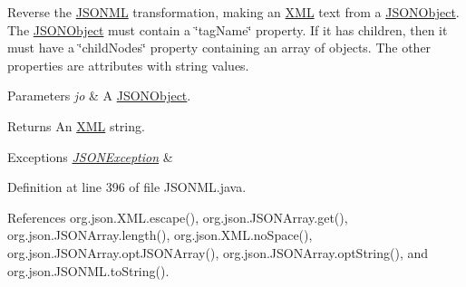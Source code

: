 Reverse the \hyperlink{classorg_1_1json_1_1_j_s_o_n_m_l}{J\-S\-O\-N\-M\-L} transformation, making an \hyperlink{classorg_1_1json_1_1_x_m_l}{X\-M\-L} text from a \hyperlink{classorg_1_1json_1_1_j_s_o_n_object}{J\-S\-O\-N\-Object}. The \hyperlink{classorg_1_1json_1_1_j_s_o_n_object}{J\-S\-O\-N\-Object} must contain a \char`\"{}tag\-Name\char`\"{} property. If it has children, then it must have a \char`\"{}child\-Nodes\char`\"{} property containing an array of objects. The other properties are attributes with string values. 
\begin{DoxyParams}{Parameters}
{\em jo} & A \hyperlink{classorg_1_1json_1_1_j_s_o_n_object}{J\-S\-O\-N\-Object}. \\
\hline
\end{DoxyParams}
\begin{DoxyReturn}{Returns}
An \hyperlink{classorg_1_1json_1_1_x_m_l}{X\-M\-L} string. 
\end{DoxyReturn}

\begin{DoxyExceptions}{Exceptions}
{\em \hyperlink{classorg_1_1json_1_1_j_s_o_n_exception}{J\-S\-O\-N\-Exception}} & \\
\hline
\end{DoxyExceptions}


Definition at line 396 of file J\-S\-O\-N\-M\-L.\-java.



References org.\-json.\-X\-M\-L.\-escape(), org.\-json.\-J\-S\-O\-N\-Array.\-get(), org.\-json.\-J\-S\-O\-N\-Array.\-length(), org.\-json.\-X\-M\-L.\-no\-Space(), org.\-json.\-J\-S\-O\-N\-Array.\-opt\-J\-S\-O\-N\-Array(), org.\-json.\-J\-S\-O\-N\-Array.\-opt\-String(), and org.\-json.\-J\-S\-O\-N\-M\-L.\-to\-String().


